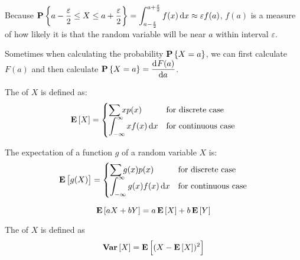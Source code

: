 Because $\probability{ a - \frac{\varepsilon}{2} \leq X \leq a + \frac{\varepsilon}{2} } =\displaystyle \int_{a - \frac{\varepsilon}{2}}^{a + \frac{\varepsilon}{2}} f(x) \dif{x} \approx \varepsilon f(a)  $, $f(a)$ is a measure of how likely it is that the random variable will be near $a$ within interval $\varepsilon$.


Sometimes when calculating the probability $\mathop{\bf P\/}\displaystyle \left\{X=a\right\}$, we can first calculate $F(a)$ and then calculate $\probability{X=a} = \dod{F(a)}{a}$.

\begin{definition}[expectation]
    The  of $X$ is defined as:
    \begin{equation}
        \expect{X} = \begin{cases}
            \displaystyle \sum x p(x) & \text{for discrete case} \\
            \displaystyle \int_{-\infty}^{\infty} x f(x) \dif{x} & \text{for continuous case}
        \end{cases}
    \end{equation}
\end{definition}




\begin{theorem}
    The expectation of a function $g$  of a random variable $X$ is:
    \begin{equation}
        \expect{g(X)} = \begin{cases}
            \displaystyle \sum g(x) p(x) & \text{for discrete case} \\
            \displaystyle \int_{-\infty}^{\infty} g(x) f(x) \dif{x} & \text{for continuous case}
        \end{cases}
    \end{equation}
\end{theorem}

\begin{theorem}
    \begin{equation}
        \mathop{\bf E\/}\displaystyle \left[ aX + bY \right] = a \mathop{\bf E\/}\displaystyle \left[ X \right] + b \mathop{\bf E\/}\displaystyle \left[ Y \right]
    \end{equation}    
\end{theorem}

\begin{definition}[variance]
    The  of $X$ is defined as
    \begin{equation}
        \mathop{\bf Var\/}\displaystyle \left[ X \right] = \mathop{\bf E\/}\displaystyle \left[ (X - \mathop{\bf E\/}\displaystyle \left[ X \right])^2 \right]
    \end{equation}
\end{definition}


